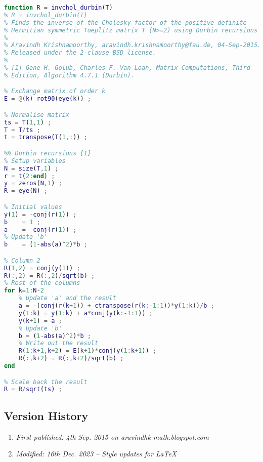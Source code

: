 \begin{lstlisting}[language=MATLAB,numbers=none]
function R = invchol_durbin(T)
% R = invchol_durbin(T)
% Finds the inverse of the Cholesky factor of the positive definite
% Hermitian symmetric Toeplitz matrix T (N>=2) using Durbin recursions [1].
%
% Aravindh Krishnamoorthy, aravindh.krishnamoorthy@fau.de, 04-Sep-2015.
% Released under the 2-clause BSD license.
%
% [1] Gene H. Golub, Charles F. Van Loan, Matrix Computations, Third
% Edition, Algorithm 4.7.1 (Durbin).

% Exchange matrix of order k
E = @(k) rot90(eye(k)) ;

% Normalise matrix
ts = T(1,1) ;
T = T/ts ;
t = transpose(T(1,:)) ;

%% Durbin recursions [1]
% Setup variables
N = size(T,1) ;
r = t(2:end) ;
y = zeros(N,1) ;
R = eye(N) ;

% Initial values
y(1) = -conj(r(1)) ;
b    = 1 ;
a    = -conj(r(1)) ;
% Update 'b'
b    = (1-abs(a)^2)*b ;

% Column 2
R(1,2) = conj(y(1)) ;
R(:,2) = R(:,2)/sqrt(b) ;
% Rest of the columns
for k=1:N-2
	% Update 'a' and the result
	a = -(conj(r(k+1)) + ctranspose(r(k:-1:1))*y(1:k))/b ;
	y(1:k) = y(1:k) + a*conj(y(k:-1:1)) ;
	y(k+1) = a ;
	% Update 'b'
	b = (1-abs(a)^2)*b ;
	% Write out the result
	R(1:k+1,k+2) = E(k+1)*conj(y(1:k+1)) ;
	R(:,k+2) = R(:,k+2)/sqrt(b) ;
end

% Scale back the result
R = R/sqrt(ts) ;
\end{lstlisting}

\subsection{Version History}
\begin{enumerate}
	\item \emph{First published: 4th Sep. 2015 on aravindhk-math.blogspot.com}
	\item \emph{Modified: 16th Dec. 2023 -- Style updates for \LaTeX}
\end{enumerate}
